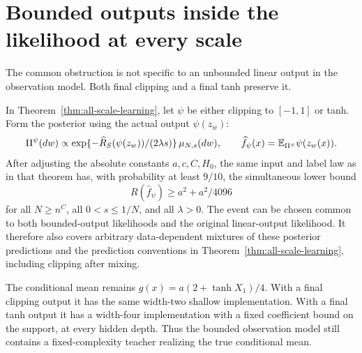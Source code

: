\section{Bounded outputs inside the likelihood at every scale}
\label{sec:all-scale-bounded-likelihood}
The common obstruction is not specific to an unbounded linear output in the observation model. Both final clipping and a final tanh preserve it.

\begin{corollary}
\label{cor:all-scale-bounded-likelihood}
In Theorem~\ref{thm:all-scale-learning}, let $\psi$ be either clipping to $[-1,1]$ or tanh. Form the posterior using the actual output $\psi(z_w)$:
\[
 \Pi^\psi(dw)\propto
       \exp\{-\widehat R_S(\psi(z_w))/(2\lambda s)\}\,\mu_{N,s}(dw),
 \qquad \widehat f_\psi(x)=\mathbb E_{\Pi^\psi}\psi(z_w(x)).
\]
After adjusting the absolute constants $a,c,C,H_0$, the same input and label law as in that theorem has, with probability at least $9/10$, the simultaneous lower bound
\[
 R(\widehat f_\psi)\ge a^2+a^2/4096
\]
for all $N\ge n^C$, all $0<s\le1/N$, and all $\lambda>0$. The event can be chosen common to both bounded-output likelihoods and the original linear-output likelihood. It therefore also covers arbitrary data-dependent mixtures of these posterior predictions and the prediction conventions in Theorem~\ref{thm:all-scale-learning}, including clipping after mixing.

The conditional mean remains $g(x)=a(2+\tanh X_1)/4$. With a final clipping output it has the same width-two shallow implementation. With a final tanh output it has a width-four implementation with a fixed coefficient bound on the support, at every hidden depth. Thus the bounded observation model still contains a fixed-complexity teacher realizing the true conditional mean.
\end{corollary}
